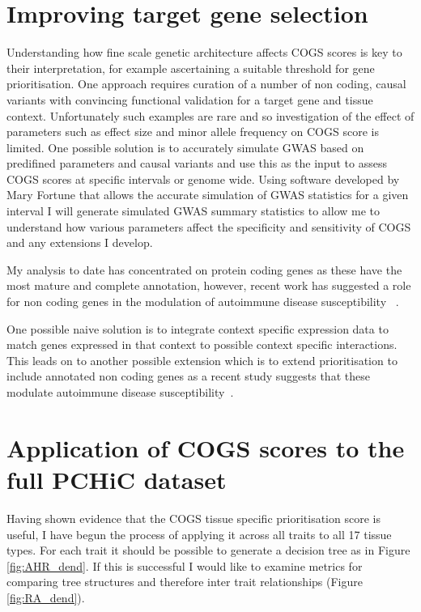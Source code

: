 \documentclass[a4paper,11pt]{report}
\begin{document}

\section{Improving target gene selection}
Understanding how fine scale genetic architecture affects COGS scores is key to their interpretation, for example ascertaining a suitable threshold for gene prioritisation. One approach requires curation of a number of non coding,  causal variants with convincing functional validation for a target gene and tissue context. Unfortunately such examples are rare and so investigation of the effect of parameters such as effect size and minor allele frequency on COGS score is limited. One possible solution is to accurately simulate GWAS based on predifined parameters and causal variants and use this as the input to assess COGS scores at specific intervals or genome wide. Using software developed by Mary Fortune that allows the accurate simulation of GWAS statistics for a given interval I will generate simulated GWAS summary statistics to allow me to understand how various parameters affect the specificity and sensitivity of COGS and any extensions I develop. 



My analysis to date has concentrated on protein coding genes as these have the most mature and complete annotation, however,  recent work has suggested a role for non coding genes in the modulation of autoimmune disease susceptibility ~\citep{Castellanos-RubioFernandez-JimenezKratchmarovEtAl2016}. 


One possible naive solution is to integrate context specific expression data to match genes expressed in that context to possible context specific interactions. This leads on to another possible extension which is to extend prioritisation to include annotated non coding genes as a recent study suggests that these modulate autoimmune disease susceptibility~\citep{Castellanos-RubioFernandez-JimenezKratchmarovEtAl2016}.

\section{Application of COGS scores to the full PCHiC dataset}
Having shown evidence that the COGS tissue specific prioritisation score is useful, I have begun the process of applying it across all traits to all 17 tissue types. For each trait it should be possible to generate a decision tree as in Figure \ref{fig:AHR_dend}. If this is successful I would like to examine metrics for comparing tree structures and therefore inter trait relationships (Figure \ref{fig:RA_dend}).
\end{document}
